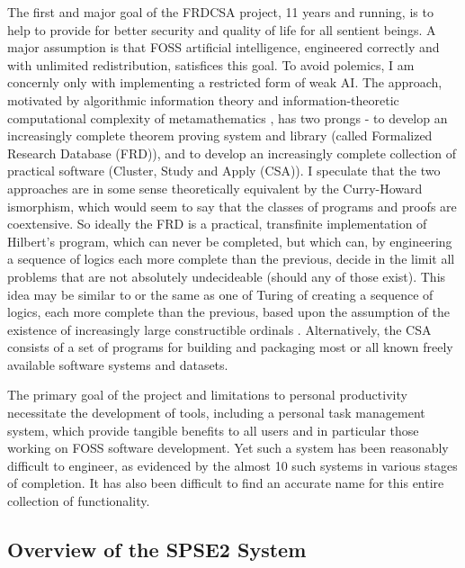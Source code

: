 \documentclass[letterpaper]{article}
\begin{document}
\noindent The first and major goal of the FRDCSA project, 11 years and
running, is to help to provide for better security and quality of life
for all sentient beings.  A major assumption is that FOSS artificial
intelligence, engineered correctly and with unlimited redistribution,
satisfices this goal.  To avoid polemics, I am concernly only with
implementing a restricted form of weak AI.  The approach, motivated by
algorithmic information theory and information-theoretic computational
complexity of metamathematics \cite{chaitin1974}, has two prongs - to
develop an increasingly complete theorem proving system and library
(called Formalized Research Database (FRD)), and to develop an
increasingly complete collection of practical software (Cluster, Study
and Apply (CSA)).  I speculate that the two approaches are in some
sense theoretically equivalent by the Curry-Howard ismorphism, which
would seem to say that the classes of programs and proofs are
coextensive.  So ideally the FRD is a practical, transfinite
implementation of Hilbert's program, which can never be completed, but
which can, by engineering a sequence of logics each more complete than
the previous, decide in the limit all problems that are not absolutely
undecideable (should any of those exist).  This idea may be similar to
or the same as one of Turing of creating a sequence of logics, each
more complete than the previous, based upon the assumption of the
existence of increasingly large constructible ordinals
\cite{turing1939}.  Alternatively, the CSA consists of a set of
programs for building and packaging most or all known freely available
software systems and datasets.

The primary goal of the project and limitations to personal
productivity necessitate the development of tools, including a
personal task management system, which provide tangible benefits to
all users and in particular those working on FOSS software
development.  Yet such a system has been reasonably difficult to
engineer, as evidenced by the almost 10 such systems in various stages
of completion.  It has also been difficult to find an accurate name
for this entire collection of functionality.

\subsection{Overview of the SPSE2 System}
\end{document}
